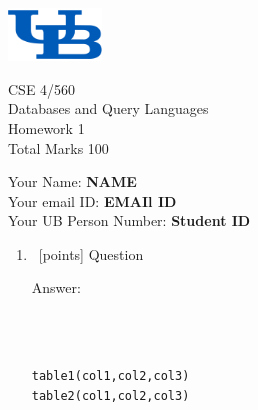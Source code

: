 \documentclass[12 pts]{article}
\author{}
\date{}
\begin{document}
    \voffset-2.5cm
    \parbox{3cm}{\includegraphics [width=25mm,scale=0.3]{ub_logo.png} }
    \parbox{8cm}{{\Large
        {CSE 4/560}\\
        {Databases and Query Languages}\\
        {Homework 1}\\
        {Total Marks 100}\\
        }
    }
    
    \vspace{1cm}
    
    \parbox{8cm}{
        {Your Name: {\bf NAME} }   \\
        {Your email ID: {\bf EMAIl ID} }   \\
        {Your UB Person Number: {\bf Student ID} }   \\
    }
    
    
    \begin{enumerate}[1.]
    
        \item ~[points] Question
        
        Answer: 
        
        \begin{verbatim}
            
            
        \end{verbatim}
      
        \begin{alltt}
             table1 (col1, col2, col3)
             table2 (col1, col2, col3)
        \end{alltt}
        
        
    \end{enumerate}
\end{document}
